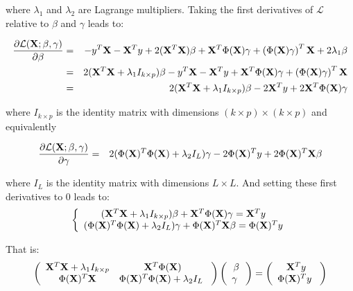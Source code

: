 \medskip

where $\lambda_1$ and $\lambda_2$ are Lagrange multipliers.  Taking the first derivatives of $\mathcal{L}$ relative to $\beta$ and $\gamma$ leads to:

\begin{eqnarray*}
\frac{\partial \mathcal{L}({\bf X};\beta, \gamma)}{\partial
\beta}
&=& - y^T{\bf X} - {\bf X}^Ty + 2 ({\bf X}^T{\bf X})\beta + {\bf X}^T
\Phi({\bf X})\gamma + \left(\Phi({\bf X})\gamma\right)^T {\bf X} + 2\lambda_1 \beta \\
&=& 2 ({\bf X}^T{\bf X} + \lambda_1 I_{k\times p})\beta - y^T{\bf X} - {\bf X}^Ty + {\bf X}^T \Phi({\bf X})\gamma +
\left(\Phi({\bf X})\gamma\right)^T {\bf X} \\
&=& 2 ({\bf X}^T{\bf X} + \lambda_1 I_{k\times p})\beta -
2 {\bf X}^Ty + 2 {\bf X}^T \Phi({\bf X})\gamma
\end{eqnarray*}

where $I_{k\times p}$ is the identity matrix with dimensions $(k\times p) \times (k\times p)$ and equivalently

\begin{eqnarray*}
\frac{\partial
\mathcal{L}({\bf X};\beta, \gamma)}{\partial \gamma} &=& 2 (\Phi({\bf X})^T\Phi({\bf X}) + \lambda_2
I_{L})\gamma -2 \Phi({\bf X})^Ty + 2 \Phi({\bf X})^T{\bf X}\beta
\end{eqnarray*}

where $I_L$ is the identity matrix with dimensions $L \times L$. And setting these first derivatives to $0$ leads to:
$$
\left\{ \begin{array}{c}
({\bf X}^T{\bf X} + \lambda_1 I_{k\times p})\beta  +  {\bf X}^T \Phi({\bf X})\gamma =  {\bf X}^Ty \\
(\Phi({\bf X})^T\Phi({\bf X}) + \lambda_2 I_{L})\gamma +  \Phi({\bf X})^T{\bf X}\beta =  \Phi({\bf X})^Ty
\end{array} \right.
$$

That is:
$$
\left( {\begin{array}{cc} {\bf X}^T{\bf X} + \lambda_1 I_{k\times p} &
{\bf X}^T\Phi({\bf X})\\ \Phi({\bf X})^T{\bf X} & \Phi({\bf X})^T\Phi({\bf X}) + \lambda_2 I_{L} \      \end{array}
} \right) \left( {\begin{array}{c} \beta \\       \gamma \      \end{array} }
\right) = \left( {\begin{array}{c} {\bf X}^Ty \\       \Phi({\bf X})^Ty \      \end{array} }
\right)
$$

